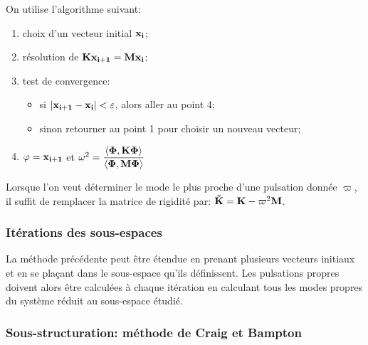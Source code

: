 On utilise l'algorithme suivant:
\begin{enumerate}
   \item choix d'un vecteur initial $\mathbf{x_i}$;
   \item résolution de $\mathbf{K}\mathbf{x_{i+1}} = \mathbf{M} \mathbf{x_i}$;
   \item test de convergence:
	\begin{itemize}
	   \item si $|\mathbf{x_{i+1}}-\mathbf{x_i}|<\varepsilon$, alors aller au point 4;
	   \item sinon retourner au point 1 pour choisir un nouveau vecteur;
	\end{itemize}
   \item $\mathbf{\varphi}=\mathbf{x_{i+1}}$ et $\omega^2=\dfrac{\langle \mathbf{\Phi}, \mathbf{K}\mathbf{\Phi}\rangle}{\langle \mathbf{\Phi}, \mathbf{M}\mathbf{\Phi}\rangle}$
\end{enumerate}

\medskip
Lorsque l'on veut déterminer le mode le plus proche d'une pulsation donnée $\varpi$, il suffit de remplacer
la matrice de rigidité par: $\mathbf{\tilde{K}}=\mathbf{K} - \varpi^2 \mathbf{M}$.




\medskip
\subsubsection{Itérations des sous-espaces}

La méthode précédente peut être étendue en prenant plusieurs vecteurs initiaux et en se plaçant dans
le sous-espace qu'ils définissent. Les pulsations propres doivent alors être calculées à chaque itération 
en calculant tous les modes propres du système réduit au sous-espace étudié.


\medskip
\subsubsection{Sous-structuration: méthode de Craig et Bampton}

